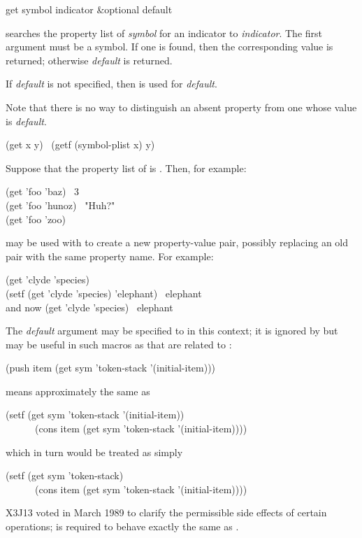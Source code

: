 \begin{defun}[Function]
get symbol indicator &optional default

 searches the property list of
\emph{symbol} for an indicator  to \emph{indicator}.
The first argument must be a symbol.
If one is found, then the corresponding value is returned;
otherwise \emph{default} is returned.

If \emph{default} is not specified,
then {\false} is used for \emph{default}.

Note that there is no way to distinguish an absent property from
one whose value is \emph{default}.
\begin{lisp}
(get x y) \EQ\ (getf (symbol-plist x) y)
\end{lisp}
Suppose that the property list of  is .
Then, for example:
\begin{lisp}
(get 'foo 'baz) \EV\ 3 \\
(get 'foo 'hunoz) \EV\ "Huh?" \\
(get 'foo 'zoo) \EV\ {\false}
\end{lisp}

 may be used with  to create a new property-value
pair, possibly replacing an old pair with the same property name.
For example:
\begin{lisp}
(get 'clyde 'species) \EV\ {\false} \\
(setf (get 'clyde 'species) 'elephant) \EV\ elephant \\
\textrm{and now} (get 'clyde 'species) \EV\ elephant
\end{lisp}
The \emph{default} argument may be
specified to  in this context; it is ignored by  but
may be useful in such macros as  that are related to :
\begin{lisp}
(push item (get sym 'token-stack '(initial-item)))
\end{lisp}
means approximately the same as
\begin{lisp}
(setf (get sym 'token-stack '(initial-item)) \\
~~~~~~(cons item (get sym 'token-stack '(initial-item))))
\end{lisp}
which in turn would be treated as simply
\begin{lisp}
(setf (get sym 'token-stack) \\
~~~~~~(cons item (get sym 'token-stack '(initial-item))))
\end{lisp}

\begin{newer}
X3J13 voted in March 1989 
to clarify the permissible side effects of certain operations;
is required to behave exactly the same as
.
\end{newer}
\end{defun}

